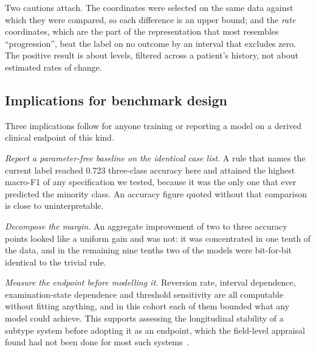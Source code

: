 \documentclass[11pt]{article}
\begin{document}
Two cautions attach. The coordinates were selected on the same data against which
they were compared, so each difference is an upper bound; and the \emph{rate}
coordinates, which are the part of the representation that most resembles
``progression'', beat the label on no outcome by an interval that excludes zero.
The positive result is about levels, filtered across a patient's history, not
about estimated rates of change.

\subsection{Implications for benchmark design}
Three implications follow for anyone training or reporting a model on a derived
clinical endpoint of this kind.

\emph{Report a parameter-free baseline on the identical case list.} A rule that
names the current label reached 0.723 three-class accuracy here and attained the
highest macro-F1 of any specification we tested, because it was the only one that
ever predicted the minority class. An accuracy figure quoted without that
comparison is close to uninterpretable.

\emph{Decompose the margin.} An aggregate improvement of two to three accuracy
points looked like a uniform gain and was not: it was concentrated in one tenth of
the data, and in the remaining nine tenths two of the models were bit-for-bit
identical to the trivial rule.

\emph{Measure the endpoint before modelling it.} Reversion rate, interval
dependence, examination-state dependence and threshold sensitivity are all
computable without fitting anything, and in this cohort each of them bounded what
any model could achieve. This supports assessing the longitudinal stability of a
subtype system before adopting it as an endpoint, which the field-level appraisal
found had not been done for most such systems~\citep{mestre2021}.
\end{document}
